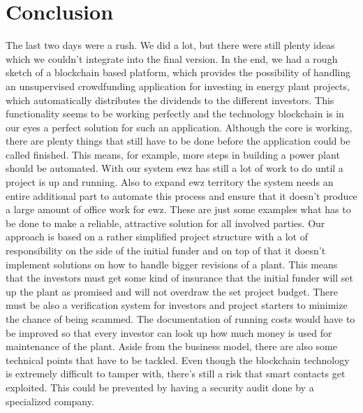 \section{Conclusion}
The last two days were a rush. We did a lot, but there were still plenty ideas which we couldn’t integrate into the final version. 
In the end, we had a rough sketch of a blockchain based platform, which provides the possibility of handling an unsupervised crowdfunding application for investing in energy plant projects, which automatically distributes the dividends to the different investors. This functionality seems to be working perfectly and the technology blockchain is in our eyes a perfect solution for such an application. 
Although the core is working, there are plenty things that still have to be done before the application could be called finished. This means, for example, more steps in building a power plant should be automated. With our system ewz has still a lot of work to do until a project is up and running. Also to expand ewz territory the system needs an entire additional part to automate this process and ensure that it doesn't produce a large amount of office work for ewz. These are just some examples what has to be done to make a reliable, attractive solution for all involved parties. 
Our approach is based on a rather simplified project structure with a lot of responsibility on the side of the initial funder and on top of that it doesn’t implement solutions on how to handle bigger revisions of a plant. This means that the investors must get some kind of insurance that the initial funder will set up the plant as promised and will not overdraw the set project budget. There must be also a verification system for investors and project starters to minimize the chance of being scammed. The documentation of running costs would have to be improved so that every investor can look up how much money is used for maintenance of the plant. 
Aside from the business model, there are also some technical points that have to be tackled. Even though the blockchain technology is extremely difficult to tamper with, there’s still a risk that smart contacts get exploited. This could be prevented by having a security audit done by a specialized company. 

